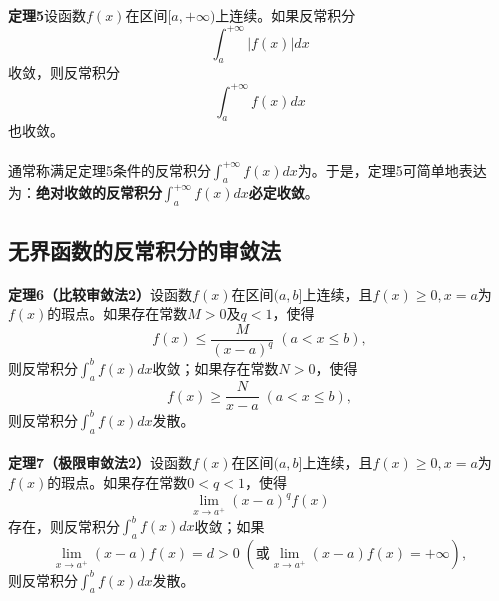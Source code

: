 \paragraph{}
\textbf{定理5\;}设函数$f(x)$在区间$[a,+\infty)$上连续。如果反常积分
\begin{equation}
  \int_a^{+\infty}|f(x)|dx
\end{equation}
收敛，则反常积分
\begin{equation}
  \int_a^{+\infty}f(x)dx
\end{equation}
也收敛。

\paragraph{}
通常称满足定理5条件的反常积分$\displaystyle\int_a^{+\infty}f(x)dx$为。于是，定理5可简单地表达为：\textbf{绝对收敛的反常积分$\displaystyle\int_a^{+\infty}f(x)dx$必定收敛}。

\subsection{无界函数的反常积分的审敛法}
\paragraph{}
\label{比较审敛法2}
\textbf{定理6（比较审敛法2）\;}设函数$f(x)$在区间$(a,b]$上连续，且$f(x) \geq 0, x = a$为$f(x)$的瑕点。如果存在常数$M > 0$及$q < 1$，使得
\begin{equation}
  f(x) \leq \frac{M}{(x-a)^q} \; (a < x \leq b),
\end{equation}
则反常积分$\displaystyle\int_a^bf(x)dx$收敛；如果存在常数$N > 0$，使得
\begin{equation}
  f(x) \geq \frac{N}{x-a} \; (a<x\leq b),
\end{equation}
则反常积分$\displaystyle\int_a^bf(x)dx$发散。

\paragraph{}
\textbf{定理7（极限审敛法2）\;}设函数$f(x)$在区间$(a,b]$上连续，且$f(x) \geq 0, x = a$为$f(x)$的瑕点。如果存在常数$0 < q < 1$，使得
\begin{equation}
  \lim_{x \to a^+}(x-a)^qf(x)
\end{equation}
存在，则反常积分$\displaystyle\int_a^bf(x)dx$收敛；如果
\begin{equation}
  \lim_{x \to a^+}(x-a)f(x) = d > 0 \; (\text{或} \lim_{x \to a^+}(x-a)f(x) = +\infty),
\end{equation}
则反常积分$\displaystyle\int_a^bf(x)dx$发散。

